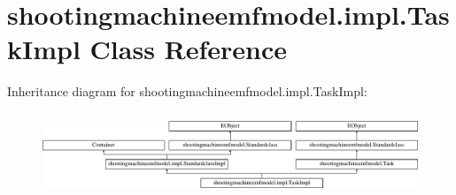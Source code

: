 \hypertarget{classshootingmachineemfmodel_1_1impl_1_1_task_impl}{\section{shootingmachineemfmodel.\-impl.\-Task\-Impl Class Reference}
\label{classshootingmachineemfmodel_1_1impl_1_1_task_impl}
}
Inheritance diagram for shootingmachineemfmodel.\-impl.\-Task\-Impl\-:\begin{figure}[H]
\begin{center}
\leavevmode
\includegraphics[height=2.497213cm]{classshootingmachineemfmodel_1_1impl_1_1_task_impl}
\end{center}
\end{figure}
